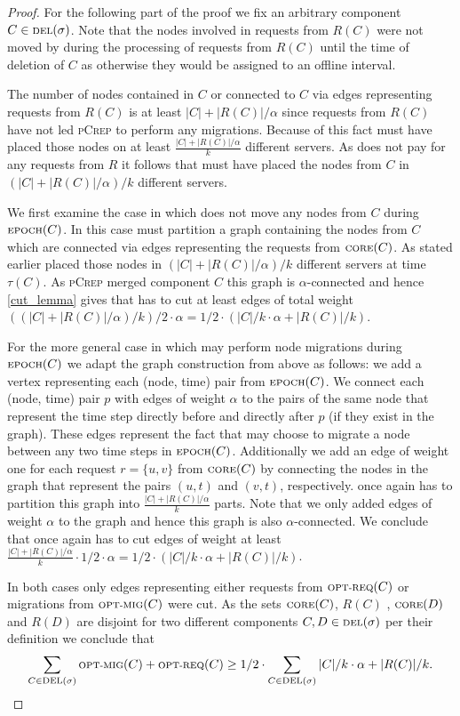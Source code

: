 \documentclass[a4paper,UKenglish,cleveref, autoref, thm-restate,authorcolumns]{../lipics/lipics-v2019}
\newcommand{\adjDel}{\textsc{pCrep}}
\newcommand{\optmig}{\text{\scriptsize OPT-MIG}}
\newcommand{\optreq}{\text{\scriptsize OPT-REQ}}
\newcommand{\del}{\text{\scriptsize DEL}}
\newcommand{\opt}{\text{O{\scriptsize PT}}}
\newcommand{\core}{\text{\scriptsize CORE}}
\newcommand{\epoch}{\text{\scriptsize EPOCH}}
\begin{document}
\begin{proof}
	For the following part of the proof we fix an arbitrary component $C\in\del{}(\sigma)$. 
	Note that the nodes involved in requests from $R(C)$ were not moved by \opt{} during the processing of 
	requests from $R(C)$ until the time of deletion of $C$ as otherwise they would be assigned to an offline interval.
	
	The number of nodes contained in $C$ or connected to $C$ via edges representing requests 
	from $R(C)$ is at least $|C|+|R(C)|/\alpha$ since requests from $R(C)$ have not led 
	\adjDel{} to perform any migrations. Because of this fact \opt{} must have placed those nodes 
	on at least $\frac{|C|+|R(C)|/\alpha}{k}$ different servers. As \opt{} does not pay for any 
	requests from $R$ it follows that \opt{} must have placed the nodes from $C$ 
	in $(|C|+|R(C)|/\alpha)/ k$ different servers.
	
	We first examine the case in which \opt{} does not move any nodes from $C$ during $\epoch(C)$. 
	In this case \opt{} must partition a graph containing the nodes from $C$ which are connected 
	via edges representing the requests from $\core(C)$. As stated earlier \opt{} placed those 
	nodes in $(|C|+|R(C)|/\alpha)/ k$ different servers at time $\tau(C)$. 
	As \adjDel{} merged component $C$ this graph is $\alpha$-connected and hence \cref{cut_lemma} 
	gives that \opt{} has to cut at least edges of total weight 
	$((|C|+|R(C)|/\alpha)/ k)/2\cdot\alpha=1/2\cdot(|C|/k\cdot\alpha+|R(C)|/k)$.
	
	For the more general case in which \opt{} may perform node migrations during $\epoch(C)$ we 
	adapt the graph construction from above as follows: we add a vertex representing each 
	(node, time) pair from $\epoch(C)$.
	We connect each (node, time) pair $p$ with edges of weight $\alpha$ to the pairs of the same 
	node that represent the time step directly before and directly after $p$ (if they exist in 
	the graph). These edges represent the fact that \opt{} may choose to migrate a node between 
	any two time steps in $\epoch(C)$.
	Additionally we add an edge of weight one for each request $r=\{u,v\}$ from $\core(C)$ by 
	connecting the nodes in the graph that represent the pairs $(u,t)$ and $(v,t)$, respectively. 
	\opt{} once again has to partition this graph into $\frac{|C|+|R(C)|/\alpha}{k}$ parts.
	Note that we only added edges of weight $\alpha$ to the graph and hence this graph is 
	also $\alpha$-connected. We conclude that once again \opt{} has to cut edges of weight 
	at least $\frac{|C|+|R(C)|/\alpha}{k}\cdot1/2\cdot\alpha=1/2\cdot(|C|/k\cdot\alpha+|R(C)|/k)$.
	
	In both cases only edges representing either requests from $\optreq(C)$ or migrations 
	from $\optmig(C)$ were cut.
	As the sets $\core(C)$, $R(C)$ , $\core(D)$ and $R(D)$ are disjoint for two different 
	components $C,D\in\del(\sigma)$ per their definition we conclude that
	\begin{align*}
	\sum_{C\in\del(\sigma)}\optmig(C)+\optreq(C)\geq 1/2\cdot\sum_{C\in\del(\sigma)}|C|/k\cdot\alpha+|R(C)|/k.
	\end{align*}
\end{proof}
\end{document}
